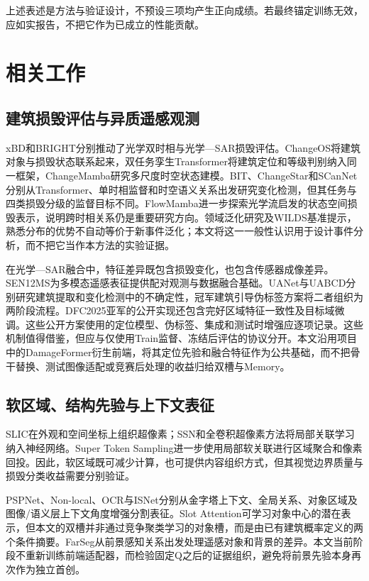 \documentclass[UTF8,a4paper,zihao=-4,fontset=none]{ctexart}
\begin{document}
上述表述是方法与验证设计，不预设三项均产生正向成绩。若最终锚定训练无效，应如实报告，不把它作为已成立的性能贡献。
\section{相关工作}

\label{sec:related-work}

\FloatBarrier

\subsection{建筑损毁评估与异质遥感观测}

xBD和BRIGHT分别推动了光学双时相与光学—SAR损毁评估\cite{ref1,ref2}。ChangeOS将建筑对象与损毁状态联系起来，双任务孪生Transformer将建筑定位和等级判别纳入同一框架，ChangeMamba研究多尺度时空状态建模\cite{ref3,ref4,ref5}。BIT、ChangeStar和SCanNet分别从Transformer、单时相监督和时空语义关系出发研究变化检测，但其任务与四类损毁分级的监督目标不同\cite{ref12,ref13,ref14}。FlowMamba进一步探索光学流启发的状态空间损毁表示，说明跨时相关系仍是重要研究方向\cite{ref15}。领域泛化研究及WILDS基准提示，熟悉分布的优势不自动等价于新事件泛化；本文将这一一般性认识用于设计事件分析，而不把它当作本方法的实验证据\cite{ref16,ref17}。

在光学—SAR融合中，特征差异既包含损毁变化，也包含传感器成像差异。SEN12MS为多模态遥感表征提供配对观测与数据融合基础\cite{ref18}。UANet与UABCD分别研究建筑提取和变化检测中的不确定性，冠军建筑引导伪标签方案将二者组织为两阶段流程\cite{ref19,ref20,ref21}。DFC2025亚军的公开实现还包含完好区域特征一致性及目标域微调\cite{ref22}。这些公开方案使用的定位模型、伪标签、集成和测试时增强应逐项记录。这些机制值得借鉴，但应与仅使用Train监督、冻结后评估的协议分开。本文沿用项目中的DamageFormer衍生前端，将其定位先验和融合特征作为公共基础，而不把骨干替换、测试图像适配或竞赛后处理的收益归给双槽与Memory。

\FloatBarrier

\subsection{软区域、结构先验与上下文表征}

SLIC在外观和空间坐标上组织超像素；SSN和全卷积超像素方法将局部关联学习纳入神经网络\cite{ref23,ref6,ref7}。Super Token Sampling进一步使用局部软关联进行区域聚合和像素回投\cite{ref8}。因此，软区域既可减少计算，也可提供内容组织方式，但其视觉边界质量与损毁分类收益需要分别验证。

PSPNet、Non-local、OCR与ISNet分别从金字塔上下文、全局关系、对象区域及图像/语义层上下文角度增强分割表征\cite{ref24,ref25,ref9,ref26}。Slot Attention可学习对象中心的潜在表示\cite{ref27}，但本文的双槽并非通过竞争聚类学习的对象槽，而是由已有建筑概率定义的两个条件摘要。FarSeg从前景感知关系出发处理遥感对象和背景的差异\cite{ref28}。本文当前阶段不重新训练前端适配器，而检验固定Q之后的证据组织，避免将前景先验本身再次作为独立首创。
\end{document}
